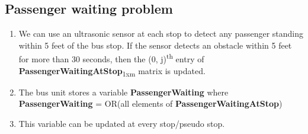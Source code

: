 \subsection{Passenger waiting problem}

\begin{enumerate}

\item We can use an ultrasonic sensor at each stop to detect any passenger standing within 5 feet of the bus stop. If the sensor detects an obstacle within 5 feet for more than 30 seconds, then the (0, j)\textsuperscript{th} entry of \textbf{PassengerWaitingAtStop}\textsubscript{1xm} matrix is updated.
\item The bus unit stores a variable \textbf{PassengerWaiting} where\\
\textbf{PassengerWaiting} = OR(all elements of \textbf{PassengerWaitingAtStop})
\item This variable can be updated at every stop/pseudo stop.

\end{enumerate}